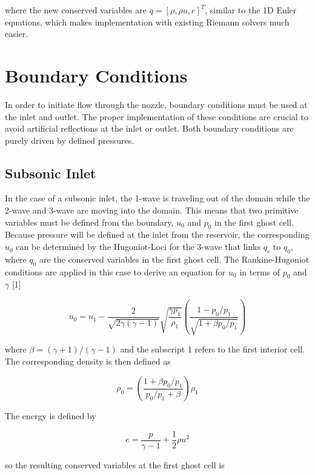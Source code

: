 \documentclass{article}%
\numberwithin{equation}{section}
\begin{document}
 where the new conserved variables are $q = [\rho, \rho u, e]^T$, similar to the 1D Euler equations, which makes implementation with existing Riemann solvers much easier. 

\section{Boundary Conditions}
In order to initiate flow through the nozzle, boundary conditions must be used at the inlet and outlet. The proper implementation of these conditions are crucial to avoid artificial reflections at the inlet or outlet. Both boundary conditions are purely driven by defined pressures.

\subsection{Subsonic Inlet}
In the case of a subsonic inlet, the 1-wave is traveling out of the domain while the 2-wave and 3-wave are moving into the domain. This means that two primitive variables must be defined from the boundary, $u_0$ and $p_0$ in the first ghost cell. Because pressure will be defined at the inlet from the reservoir, the corresponding $u_0$ can be determined by the Hugoniot-Loci for the 3-wave that links $q_r$ to $q_0$, where $q_0$ are the conserved variables in the first ghost cell. The Rankine-Hugoniot conditions are applied in this case to derive an equation for $u_0$ in terms of $p_0$ and $\gamma$ [1]

\begin{equation}
u_0 = u_1 - \frac{2}{\sqrt{2 \gamma (\gamma - 1)}} \sqrt{\frac{\gamma p_1}{\rho_1}} \left( \frac{1 - p_0 / p_1}{\sqrt{1 + \beta p_0 / p_1}} \right)
\end{equation}

where $\beta = (\gamma + 1) / (\gamma  - 1)$ and the subscript 1 refers to the first interior cell. The corresponding density is then defined as

\begin{equation}
\rho_0 = \left( \frac{1 + \beta p_0 / p_1}{p_0 /p_1 + \beta} \right) \rho_1
\end{equation}

The energy is defined by 

\begin{equation}
e = \frac{p}{\gamma - 1} + \frac{1}{2} \rho u^2
\end{equation}

so the resulting conserved variables at the first ghost cell is 
\end{document}
